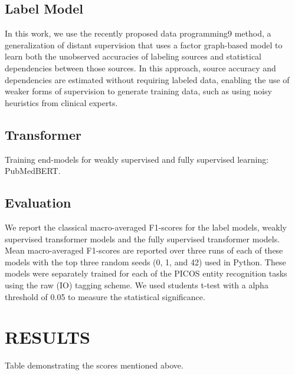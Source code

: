 \documentclass[10.7pt,]{article}
\begin{document}
\subsection{Label Model}\label{lms}
%
In this work, we use the recently proposed data programming9 method, a generalization of distant supervision that uses a factor graph-based model to learn both the unobserved accuracies of labeling sources and statistical dependencies between those sources.
In this approach, source accuracy and dependencies are estimated without requiring labeled data, enabling the use of weaker forms of supervision to generate training data, such as using noisy heuristics from clinical experts.
%
%
%
\subsection{Transformer}\label{transformers}
%
Training end-models for weakly supervised and fully supervised learning: PubMedBERT.
%
%
%
\subsection{Evaluation}\label{eval}
%
We report the classical macro-averaged F1-scores for the label models, weakly supervised transformer models and the fully supervised transformer models.
Mean macro-averaged F1-scores are reported over three runs of each of these models with the top three random seeds (0, 1, and 42) used in Python.
These models were separately trained for each of the PICOS entity recognition tasks using the raw (IO) tagging scheme.
We used students t-test with a alpha threshold of 0.05 to measure the statistical significance.
%
%
%
\section{RESULTS}\label{results}
%
Table demonstrating the scores mentioned above.
\end{document}
